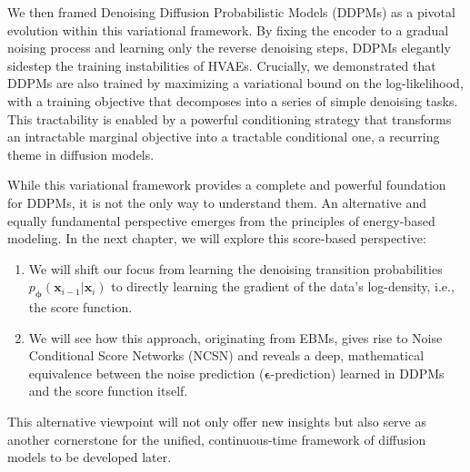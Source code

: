 We then framed Denoising Diffusion Probabilistic Models (DDPMs) as a pivotal evolution within this variational framework. By fixing the encoder to a gradual noising process and learning only the reverse denoising steps, DDPMs elegantly sidestep the training instabilities of HVAEs. Crucially, we demonstrated that DDPMs are also trained by maximizing a variational bound on the log-likelihood, with a training objective that decomposes into a series of simple denoising tasks. This tractability is enabled by a powerful conditioning strategy that transforms an intractable marginal objective into a tractable conditional one, a recurring theme in diffusion models.





While this variational framework provides a complete and powerful foundation for DDPMs, it is not the only way to understand them. An alternative and equally fundamental perspective emerges from the principles of energy-based modeling. In the next chapter, we will explore this score-based perspective:
\begin{enumerate}
    \item We will shift our focus from learning the denoising transition probabilities $p_{\bm{\phi}}(\mathbf{x}_{i-1}\vert\mathbf{x}_{i})$ to directly learning the gradient of the data's log-density, i.e., the score function.
    \item We will see how this approach, originating from EBMs, gives rise to Noise Conditional Score Networks (NCSN) and reveals a deep, mathematical equivalence between the noise prediction ($\bm{\epsilon}$-prediction) learned in DDPMs and the score function itself.
\end{enumerate}

This alternative viewpoint will not only offer new insights but also serve as another cornerstone for the unified, continuous-time framework of diffusion models to be developed later.







